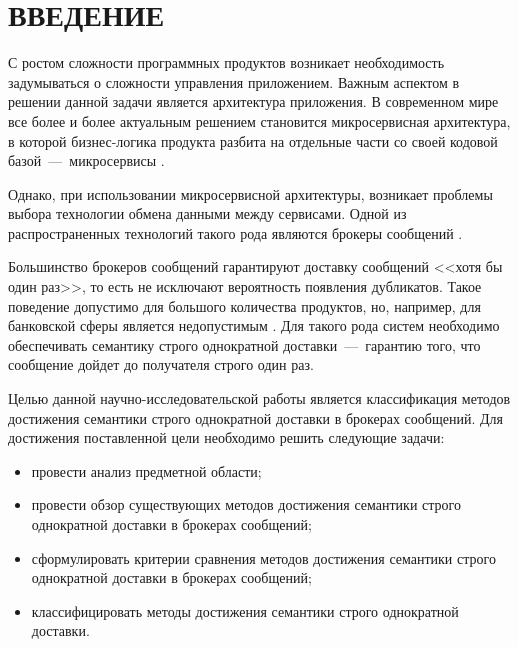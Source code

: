 \chapter*{ВВЕДЕНИЕ}

С ростом сложности программных продуктов возникает необходимость задумываться о сложности управления приложением. 
Важным аспектом в решении данной задачи является архитектура приложения. 
В современном мире все более и более актуальным решением становится микросервисная архитектура, в которой бизнес-логика продукта разбита на отдельные части со своей кодовой базой~---~микросервисы \cite{bib:1}.

Однако, при использовании микросервисной архитектуры, возникает проблемы выбора технологии обмена данными между сервисами. 
Одной из распространенных технологий такого рода являются брокеры сообщений \cite{bib:2}.

Большинство брокеров сообщений гарантируют доставку сообщений <<хотя бы один раз>>, то есть не исключают вероятность появления дубликатов. Такое поведение допустимо для большого количества продуктов, но, например, для банковской сферы является недопустимым \cite{shegalov2002eos}. Для такого рода систем необходимо обеспечивать семантику строго однократной доставки~---~гарантию того, что сообщение дойдет до получателя строго один раз.

Целью данной научно-исследовательской работы является классификация методов достижения семантики строго однократной доставки в брокерах сообщений. Для достижения поставленной цели необходимо решить следующие задачи:

\begin{itemize}
\item провести анализ предметной области;
\item провести обзор существующих методов достижения семантики строго однократной доставки в брокерах сообщений;
\item сформулировать критерии сравнения методов достижения семантики строго однократной доставки в брокерах сообщений;
\item классифицировать методы достижения семантики строго однократной доставки.	
\end{itemize}